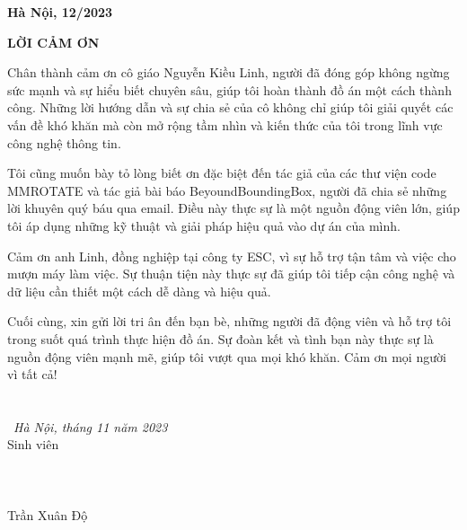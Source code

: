 \documentclass[12pt,a4paper,openany,oneside]{report}
\begin{document}
\vfill
\begin{center}
	{{\bf Hà Nội, 12/2023}}
\end{center}


\newpage
\restoregeometry
 \pagestyle{fancy}
 \fontsize{13pt}{13pt}\selectfont \baselineskip 0.75cm 

\tableofcontents

\newpage
\begin{center}
	\Large{\textbf{LỜI CẢM ƠN}}\\
\end{center}
\vspace{1cm}
Chân thành cảm ơn cô giáo Nguyễn Kiều Linh, người đã đóng góp không ngừng sức mạnh và sự hiểu biết chuyên sâu, giúp tôi hoàn thành đồ án một cách thành công. Những lời hướng dẫn và sự chia sẻ của cô không chỉ giúp tôi giải quyết các vấn đề khó khăn mà còn mở rộng tầm nhìn và kiến thức của tôi trong lĩnh vực công nghệ thông tin.

Tôi cũng muốn bày tỏ lòng biết ơn đặc biệt đến tác giả của các thư viện code MMROTATE và tác giả bài báo BeyoundBoundingBox, người đã chia sẻ những lời khuyên quý báu qua email. Điều này thực sự là một nguồn động viên lớn, giúp tôi áp dụng những kỹ thuật và giải pháp hiệu quả vào dự án của mình.

Cảm ơn anh Linh, đồng nghiệp tại công ty ESC, vì sự hỗ trợ tận tâm và việc cho mượn máy làm việc. Sự thuận tiện này thực sự đã giúp tôi tiếp cận công nghệ và dữ liệu cần thiết một cách dễ dàng và hiệu quả.

Cuối cùng, xin gửi lời tri ân đến bạn bè, những người đã động viên và hỗ trợ tôi trong suốt quá trình thực hiện đồ án. Sự đoàn kết và tình bạn này thực sự là nguồn động viên mạnh mẽ, giúp tôi vượt qua mọi khó khăn. Cảm ơn mọi người vì tất cả!
\
 \\
 
 \
  \\
 \
  \\
 
\phantom{nnnnnnnnnnnnnnnnnnnnnnnnnnnnnnn}\  {\textit{Hà Nội, tháng 11  năm 2023}} \\
\phantom{nnnnnnnnnnnnnnnnnnnnnnnnnnnnnnnnnnnnnnnnn} {Sinh viên}\\
\phantom{nnnnnnnnnnnnnnnnnnnnnnnnnnnnnnnnnn} \\
\phantom{nnnnnnnnnnnnnnnnnnnnnnnnnnnnnnnnnn} \\ 
\phantom{nnnnnnnnnnnnnnnnnnnnnnnnnnnnnnnnnn} \\ 
\phantom{nnnnnnnnnnnnnnnnnnnnnnnnnnnnnnnnnnnnnnn}   {Trần Xuân Độ}
\end{document}
